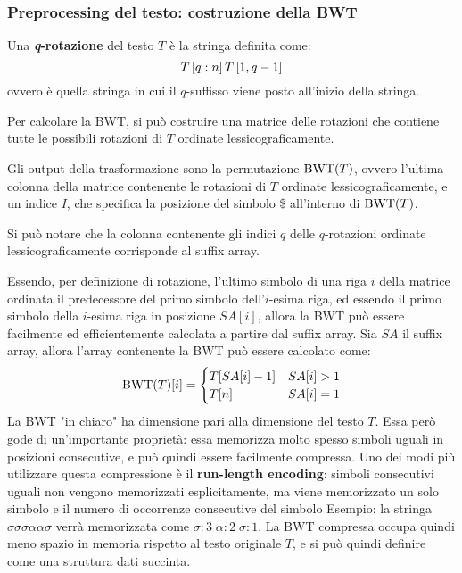 \subsubsection{Preprocessing del testo: costruzione della BWT}
\begin{defn}
    Una \textbf{\textit{q}-rotazione} del testo $T$ è la stringa definita come:
    \[
        T\left[q:n\right]T\left[1, q-1\right]
    \]
    ovvero è quella stringa in cui il $q$-suffisso viene posto all'inizio della stringa.
\end{defn}
Per calcolare la BWT, si può costruire una matrice delle rotazioni che contiene tutte le possibili rotazioni di $T$ ordinate lessicograficamente.
\begin{defn}
    Gli output della trasformazione sono la permutazione $\textnormal{BWT}(T)$, ovvero l'ultima colonna della matrice contenente le rotazioni di $T$ ordinate lessicograficamente, e un indice $I$, che specifica la posizione del simbolo \$ all'interno di $\textnormal{BWT}(T)$.
\end{defn}
\begin{rem}
    Si può notare che la colonna contenente gli indici $q$ delle $q$-rotazioni ordinate lessicograficamente corrisponde al suffix array.
\end{rem}
Essendo, per definizione di rotazione, l'ultimo simbolo di una riga $i$ della matrice ordinata il predecessore del primo simbolo dell'$i$-esima riga, ed essendo il primo simbolo della $i$-esima riga in posizione $SA[i]$, allora la BWT può essere facilmente ed efficientemente calcolata a partire dal suffix array. Sia $SA$ il suffix array, allora l'array contenente la BWT può essere calcolato come:
\[
    \textnormal{BWT}(T)[i] = \begin{cases}
        T[SA[i]-1] & SA[i] > 1 \\
        T[n] & SA[i] = 1
    \end{cases}
\]
La BWT "in chiaro" ha dimensione pari alla dimensione del testo $T$. Essa però gode di un'importante proprietà: essa memorizza molto spesso simboli uguali in posizioni consecutive, e può quindi essere facilmente compressa. Uno dei modi più utilizzare questa compressione è il \textbf{run-length encoding}: simboli consecutivi uguali non vengono memorizzati esplicitamente, ma viene memorizzato un solo simbolo e il numero di occorrenze consecutive del simbolo 
Esempio: la stringa $\sigma \sigma \sigma \alpha \alpha \sigma$ verrà memorizzata come $\sigma : 3 \; \alpha : 2 \; \sigma : 1$.
La BWT compressa occupa quindi meno spazio in memoria rispetto al testo originale $T$, e si può quindi definire come una struttura dati succinta.

